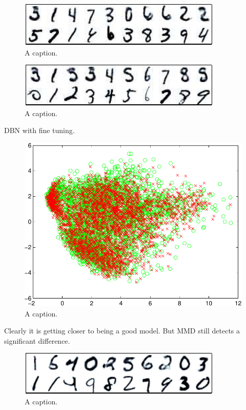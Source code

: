 \documentclass{article} %
\begin{document}
\begin{figure}[ht]
\centering
\includegraphics[width=0.98\columnwidth]{figures/dbn_witness_peaks}
\caption{
A caption.
}
\label{fig:dbn_witness_peaks}
\end{figure}

\begin{figure}[ht]
\centering
\includegraphics[width=0.98\columnwidth]{figures/dbn_cond}
\caption{
A caption.
}
\label{fig:dbn_cond}
\end{figure}

DBN with fine tuning.

\begin{figure}[ht]
\centering
\includegraphics[width=0.98\columnwidth]{figures/dbn_ft_pca}
\caption{
A caption.
}
\label{fig:dbn_ft_pca}
\end{figure}

Clearly it is getting closer to being a good model.
But MMD still detects a significant difference.

\begin{figure}[ht]
\centering
\includegraphics[width=0.98\columnwidth]{figures/dbn_ft_witness_peaks}
\caption{
A caption.
}
\label{fig:dbn_ft_witness_peaks}
\end{figure}
\end{document}
